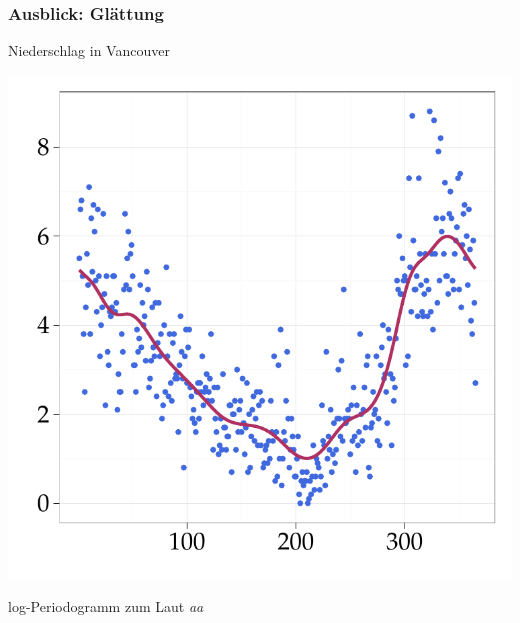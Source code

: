 \documentclass[xcolor=dvipsnames, compress, serif, professionalfont, handout]{beamer}
\newenvironment{knitrout}{}{} %
\renewenvironment{knitrout}{\begin{footnotesize}}{\end{footnotesize}}
\begin{document}
\begin{frame}[fragile]
  \frametitle{Ausblick: Gl\"attung}
  \hspace{-0.1cm} 


  \begin{minipage}{0.48\textwidth}
  Niederschlag in Vancouver
\begin{knitrout}
\color{fgcolor}

{\centering \includegraphics[width=\linewidth,height=\linewidth]{figure/graphics-GR_canada} 

}


\end{knitrout}

  \end{minipage}
  \hspace{0.1cm}
  \begin{minipage}{0.48\textwidth}
  log-Periodogramm zum Laut \textit{aa}
\begin{knitrout}
\color{fgcolor}


\end{knitrout}
\end{minipage}
\end{frame}
\end{document}
